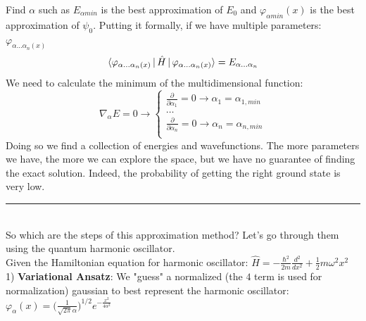Find $\alpha$ such as $E_{\alpha min}$ is the best approximation of $E_0$ and $\varphi_{\alpha min}(x)$ is the best approximation of $\psi_0$. Putting it formally, if we have multiple parameters: $\varphi_{\alpha \dots \alpha_n(x)}$
\[
\braket{\varphi_{\alpha \dots \alpha_n(x)}\,|\,\hat{H}\,|\,\varphi_{\alpha \dots \alpha_n(x)}} = E_{\alpha \dots \alpha_n}
\]
We need to calculate the minimum of the multidimensional function:
\[
\nabla_{\alpha}E=0 \rightarrow
\begin{cases}
\frac{\partial}{\partial \alpha_1}=0 \rightarrow \alpha_1=\alpha_{1, min}\\
\dots\\
\frac{\partial}{\partial \alpha_n}=0 \rightarrow \alpha_n= \alpha_{n, min}\\
\end{cases}
\]
Doing so we find a collection of energies and wavefunctions. The more parameters we have, the more we can explore the space, but  we have no guarantee of finding the exact solution. Indeed, the probability of getting the right ground state is very low.
\newline
\noindent\rule{4cm}{0.1pt}
\newline
\\
So which are the steps of this approximation method? Let's go through them using the quantum harmonic oscillator.\\

Given the Hamiltonian equation for harmonic oscillator: $\hat{H}=-\frac{\hbar^2}{2m}\frac{d^2}{dx^2}+\frac{1}{2}m\omega^2x^2$\\
1) \textbf{Variational Ansatz}: We "guess" a normalized (the $4$ term is used for normalization) gaussian to best represent the harmonic oscillator: $\varphi_{\alpha}(x)=\bigg(\frac{1}{\sqrt{2\pi}\alpha}\bigg)^{1/2}e^{-{\frac{x^2}{4\alpha^2}}}$\\

